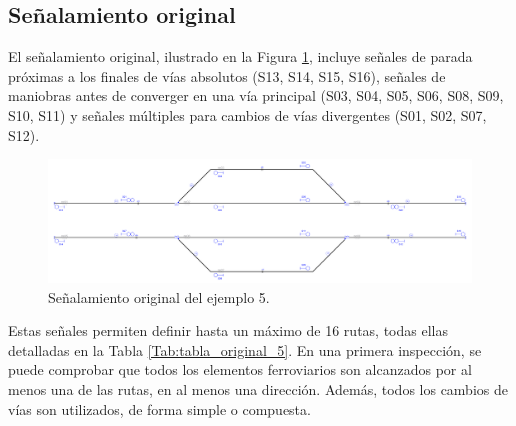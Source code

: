 \subsection{Señalamiento original}

    El señalamiento original, ilustrado en la Figura \ref{fig:EJ5_2}, incluye señales de parada próximas a los finales de vías absolutos (S13, S14, S15, S16), señales de maniobras antes de converger en una vía principal (S03, S04, S05, S06, S08, S09, S10, S11) y señales múltiples para cambios de vías divergentes (S01, S02, S07, S12).
    
    \begin{figure}[H]
    	\centering
    	\includegraphics[width=1\textwidth]{resultados-obtenidos/ejemplo5/images/5_original.png}
    	\centering\caption{Señalamiento original del ejemplo 5.}
    	\label{fig:EJ5_2}
    \end{figure}
    
    Estas señales permiten definir hasta un máximo de 16 rutas, todas ellas detalladas en la Tabla \ref{Tab:tabla_original_5}. En una primera inspección, se puede comprobar que todos los elementos ferroviarios son alcanzados por al menos una de las rutas, en al menos una dirección. Además, todos los cambios de vías son utilizados, de forma simple o compuesta. 
    
